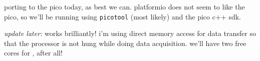 porting to the pico today, as best we can. platformio does not seem to like the
pico, so we'll be running using \verb`picotool` (most likely) and the pico c++
sdk.

\textit{update later:} works brilliantly! i'm using direct memory access for
\spi data transfer so that the processor is not hung while doing data
acquisition. we'll have two free cores for \dsp, after all!
